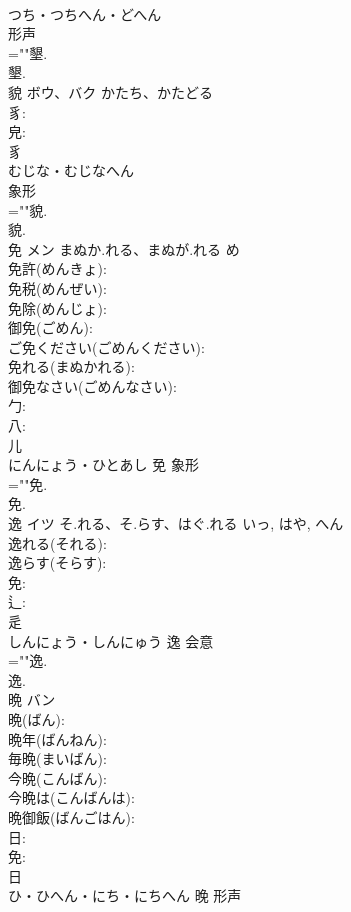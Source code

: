 \documentclass[8pt]{extreport}
\begin{document}
\begin{CJK}{UTF8}{min}
\\	つち・つちへん・どへん	
\\	形声 
\\	=""墾.
\\	墾.
\\	貌	ボウ、バク	かたち、かたどる		
\\	豸: 
\\	皃: 
\\	豸	
\\	むじな・むじなへん	
\\	象形 
\\	=""貌.
\\	貌.
\\	免	メン	まぬか.れる、まぬが.れる	め	
\\	免許(めんきょ): 
\\	免税(めんぜい): 
\\	免除(めんじょ): 
\\	御免(ごめん): 
\\	ご免ください(ごめんください): 
\\	免れる(まぬかれる): 
\\	御免なさい(ごめんなさい): 
\\	勹: 
\\	八: 
\\	儿	
\\	にんにょう・ひとあし	免	象形 
\\	=""免.
\\	免.
\\	逸	イツ	そ.れる、そ.らす、はぐ.れる	いっ, はや, へん	
\\	逸れる(それる): 
\\	逸らす(そらす): 
\\	免: 
\\	辶: 
\\	辵	
\\	しんにょう・しんにゅう	逸	会意 
\\	=""逸.
\\	逸.
\\	晩	バン			
\\	晩(ばん): 
\\	晩年(ばんねん): 
\\	毎晩(まいばん): 
\\	今晩(こんばん): 
\\	今晩は(こんばんは): 
\\	晩御飯(ばんごはん): 
\\	日: 
\\	免: 
\\	日	
\\	ひ・ひへん・にち・にちへん	晚	形声 

\end{CJK}
\end{document}
